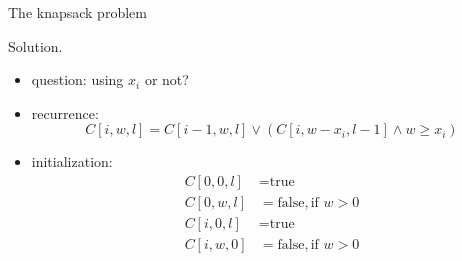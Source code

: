 \begin{frame}{The knapsack problem}
  \begin{block}{Solution.}
    \begin{itemize}
      \item question: using $x_{i}$ or not?
      \item recurrence: 
	\[
	  C[i,w,l] = C[i-1,w,l] \lor \left( C[i,w-x_{i},l-1] \land w \ge x_{i} \right)
	\]
      \item<2-> initialization:
	\begin{align*}
	  C[0,0,l] &= \text{true} \\
	  C[0,w,l] &= \text{false}, \text{if } w > 0 \\
	  C[i,0,l] &= \text{true} \\
	  C[i,w,0] &= \text{false}, \text{if } w > 0
	\end{align*}
    \end{itemize}
  \end{block}
\end{frame}
